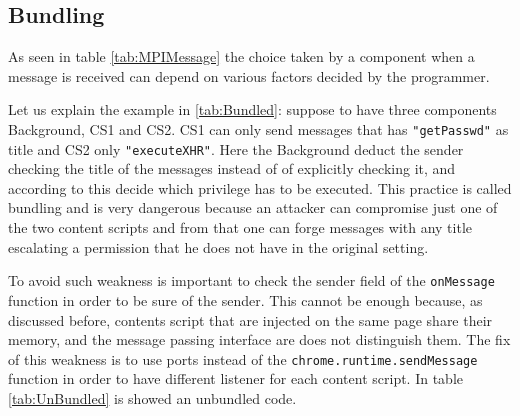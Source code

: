 \subsection{Bundling}
\label{sec:Bundling} 
As seen in table \ref{tab:MPIMessage} the choice taken by a component when a message is received can depend on various factors decided by the programmer.

Let us explain the example in \ref{tab:Bundled}: suppose to have three components Background, CS1 and CS2. CS1 can only send messages that has \texttt{"getPasswd"} as title and CS2 only \texttt{"executeXHR"}. Here the Background deduct the sender checking the title of the messages instead of of explicitly checking it, and according to this decide which privilege has to be executed. This practice is called bundling and is very dangerous because an attacker can compromise just one of the two content scripts and from that one can forge messages with any title escalating a permission that he does not have in the original setting.

To avoid such weakness is important to check the sender field of the \texttt{onMessage} function in order to be sure of the sender. This cannot be enough because, as discussed before, contents script that are injected on the same page share their memory, and the message passing interface are does not distinguish them. The fix of this weakness is to use ports instead of the \texttt{chrome.runtime.sendMessage} function in order to have different listener for each content script. In table \ref{tab:UnBundled} is showed an unbundled code.

